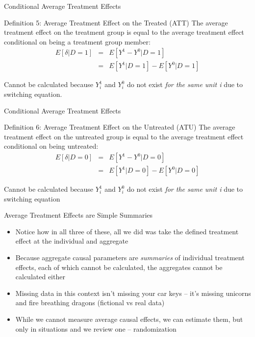 \documentclass{beamer}
\begin{document}
\begin{frame}{Conditional Average Treatment Effects}


  \begin{block}{Definition 5: Average Treatment Effect on the Treated (ATT)}
    The average treatment effect on the treatment group is equal to the average treatment effect conditional on being a treatment group member:
    \begin{eqnarray*}
      E[\delta|D=1]&=&E[Y^1-Y^0|D=1] \nonumber \\
      &=&E[Y^1|D=1]-E[Y^0|D=1]
    \end{eqnarray*}
  \end{block}
  Cannot be calculated because $Y^1_i$ and $Y^0_i$ do not exist \emph{for the same unit i} due to switching equation. 


\end{frame}



\begin{frame}{Conditional Average Treatment Effects}

  \begin{block}{Definition 6: Average Treatment Effect on the Untreated (ATU)}
    The average treatment effect on the untreated group is equal to the average treatment effect conditional on being untreated:
    \begin{eqnarray*}
      E[\delta|D=0]&=&E[Y^1-Y^0|D=0] \nonumber \\
      &=&E[Y^1|D=0]-E[Y^0|D=0]
    \end{eqnarray*}
  \end{block}
  Cannot be calculated because $Y^1_i$ and $Y^0_i$ do not exist \emph{for the same unit i} due to switching equation

\end{frame}


\begin{frame}{Average Treatment Effects are Simple Summaries}

  \begin{itemize}
	\item Notice how in all three of these, all we did was take the defined treatment effect at the individual and aggregate
	\item Because aggregate causal parameters are \emph{summaries} of individual treatment effects, each of which cannot be calculated, the aggregates cannot be calculated either
	\item Missing data in this context isn't missing your car keys -- it's missing unicorns and fire breathing dragons (fictional vs real data)
	\item While we cannot measure average causal effects, we can estimate them, but only in situations and we review one -- randomization
  \end{itemize}

\end{frame}
\end{document}
